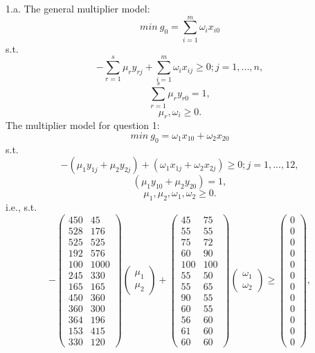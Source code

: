 \documentclass{article}
\begin{document}
1.a.
The general multiplier model:
$$ min\ g_0 = \sum_{i=1}^m \omega_i x_{i0} $$
s.t.
$$ - \sum_{r=1}^s \mu_r y_{rj} + \sum_{i=1}^m \omega_i x_{ij} \geq 0; j = 1, ..., n, $$
$$ \sum_{r=1}^s \mu_r y_{r0} = 1, $$
$$ \mu_r, \omega_i \geq 0. $$
The multiplier model for question 1:
$$ min\ g_0 = \omega_1 x_{10} + \omega_2 x_{20} $$
s.t.
$$ - (\mu_1 y_{1j} + \mu_2 y_{2j}) + (\omega_1 x_{1j} + \omega_2 x_{2j}) \geq 0; j = 1, ..., 12, $$
$$ (\mu_1 y_{10} + \mu_2 y_{20}) = 1, $$
$$ \mu_1, \mu_2, \omega_1, \omega_2 \geq 0. $$
i.e., s.t.
$$ 
-
\begin{pmatrix}
  450 & 45 \\
  528 & 176 \\
  525 & 525 \\
  192 & 576 \\
  100 & 1000 \\
  245 & 330 \\
  165 & 165 \\
  450 & 360 \\
  360 & 300 \\
  364 & 196 \\
  153 & 415 \\
  330 & 120
\end{pmatrix}
\begin{pmatrix}
  \mu_1 \\
  \mu_2
\end{pmatrix}
+
\begin{pmatrix}
  45 & 75 \\
  55 & 55 \\
  75 & 72 \\
  60 & 90 \\
  100 & 100 \\
  55 & 50 \\
  55 & 65 \\
  90 & 55 \\
  60 & 55 \\
  56 & 60 \\
  61 & 60 \\
  60 & 60
\end{pmatrix}
\begin{pmatrix}
  \omega_1 \\
  \omega_2
\end{pmatrix}
\geq
\begin{pmatrix}
  0 \\
  0 \\
  0 \\
  0 \\
  0 \\
  0 \\
  0 \\
  0 \\
  0 \\
  0 \\
  0 \\
  0 
\end{pmatrix}, 
$$
\end{document}
